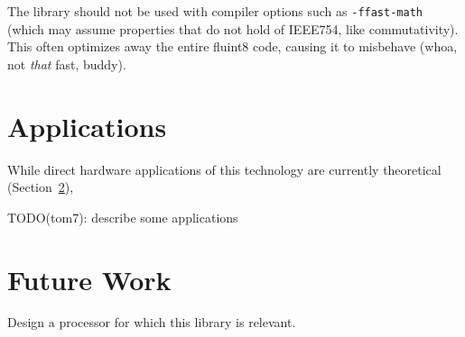 \documentclass{acmsiggraph}
\theoremstyle{remark}
\theoremstyle{definition}
\begin{document}
The library should not be used with compiler options such as
\verb+-ffast-math+ (which may assume properties that do not hold of
IEEE754, like commutativity). This often optimizes away the entire
fluint8 code, causing it to misbehave (whoa, not {\em that} fast,
buddy).

\section{Applications}

While direct hardware applications of this technology are currently
theoretical (Section~\ref{sec:future}), 

TODO(tom7): describe some applications

\section{Future Work} \label{sec:future}

Design a processor for which this library is relevant.
\end{document}
